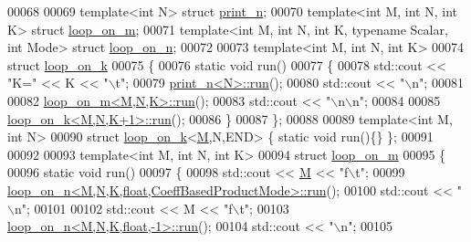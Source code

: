 \begin{DoxyCode}
00068 
00069 \textcolor{keyword}{template}<\textcolor{keywordtype}{int} N> \textcolor{keyword}{struct }\hyperlink{structprint__n}{print\_n};
00070 \textcolor{keyword}{template}<\textcolor{keywordtype}{int} M, \textcolor{keywordtype}{int} N, \textcolor{keywordtype}{int} K> \textcolor{keyword}{struct }\hyperlink{structloop__on__m}{loop\_on\_m};
00071 \textcolor{keyword}{template}<\textcolor{keywordtype}{int} M, \textcolor{keywordtype}{int} N, \textcolor{keywordtype}{int} K, \textcolor{keyword}{typename} Scalar, \textcolor{keywordtype}{int} Mode> \textcolor{keyword}{struct }\hyperlink{structloop__on__n}{loop\_on\_n};
00072 
00073 \textcolor{keyword}{template}<\textcolor{keywordtype}{int} M, \textcolor{keywordtype}{int} N, \textcolor{keywordtype}{int} K>
00074 \textcolor{keyword}{struct }\hyperlink{structloop__on__k}{loop\_on\_k}
00075 \{
00076   \textcolor{keyword}{static} \textcolor{keywordtype}{void} run()
00077   \{
00078     std::cout << \textcolor{stringliteral}{"K="} << K << \textcolor{stringliteral}{"\(\backslash\)t"};
00079     \hyperlink{structprint__n}{print\_n<N>::run}();
00080     std::cout << \textcolor{stringliteral}{"\(\backslash\)n"};
00081 
00082     \hyperlink{structloop__on__m}{loop\_on\_m<M,N,K>::run}();
00083     std::cout << \textcolor{stringliteral}{"\(\backslash\)n\(\backslash\)n"};
00084 
00085     \hyperlink{structloop__on__k}{loop\_on\_k<M,N,K+1>::run}();
00086   \}
00087 \};
00088 
00089 \textcolor{keyword}{template}<\textcolor{keywordtype}{int} M, \textcolor{keywordtype}{int} N>
00090 \textcolor{keyword}{struct }\hyperlink{structloop__on__k}{loop\_on\_k}<\hyperlink{group___core___module_class_eigen_1_1_matrix}{M},N,END> \{ \textcolor{keyword}{static} \textcolor{keywordtype}{void} run()\{\} \};
00091 
00092 
00093 \textcolor{keyword}{template}<\textcolor{keywordtype}{int} M, \textcolor{keywordtype}{int} N, \textcolor{keywordtype}{int} K>
00094 \textcolor{keyword}{struct }\hyperlink{structloop__on__m}{loop\_on\_m}
00095 \{
00096   \textcolor{keyword}{static} \textcolor{keywordtype}{void} run()
00097   \{
00098     std::cout << \hyperlink{group___core___module_class_eigen_1_1_matrix}{M} << \textcolor{stringliteral}{"f\(\backslash\)t"};
00099     \hyperlink{structloop__on__n}{loop\_on\_n<M,N,K,float,CoeffBasedProductMode>::run}();
00100     std::cout << \textcolor{stringliteral}{"\(\backslash\)n"};
00101     
00102     std::cout << M << \textcolor{stringliteral}{"f\(\backslash\)t"};
00103     \hyperlink{structloop__on__n}{loop\_on\_n<M,N,K,float,-1>::run}();
00104     std::cout << \textcolor{stringliteral}{"\(\backslash\)n"};
00105 

\end{DoxyCode}
